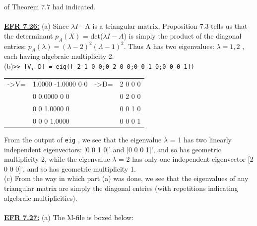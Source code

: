 \documentclass[../main.tex]{subfiles}
\begin{document}
of Theorem 7.7 had indicated. 
\\
\\
\textbf{\underline{EFR 7.26:}} (a) Since $\lambda I$ - A is a triangular matrix, Proposition 7.3 tells us that the determinant 
$p_A(X)$ = det($\lambda I - A$) is simply the product of the diagonal entries: $p_A(\lambda) = (\lambda - 2)^2(\Lambda -1)^2$. Thus A 
has two eigenvalues: $\lambda=1,2$ , each having algebraic multiplicity 2. \\
(b)\texttt{>> [V, D] = eig([ 2 1 0 0;0 2 0 0;0 0 1 0;0 0 0 1]) }\\
\begin{center}
\begin{tabular}{|l|l|l|l|}
\hline
->V=&1.0000  -1.0000  0  0&->D=&2 0 0 0\\
&0  0.0000  0  0&&0 2 0 0\\
&0  0  1.0000  0&&0 0 1 0\\
&0  0  0  1.0000&&0 0 0 1\\
\hline
\end{tabular}
\end{center}
From the output of \texttt{eig} , we see that the eigenvalue $\lambda$ = 1 has two linearly independent eigenvectors: 
[0 0 1 0]' and [0 0 0 1]', and so has geometric multiplicity 2, while the eigenvalue $\lambda$ = 2 has only one 
independent eigenvector [2 0 0 0]', and so has geometric multiplicity 1. \\
(c) From the way in which part (a) was done, we see that the eigenvalues of any triangular matrix are 
simply the diagonal entries (with repetitions indicating algebraic multiplicities). 
\\
\\
\textbf{\underline{EFR 7.27:}} (a) The M-file is boxed below:
\end{document}

